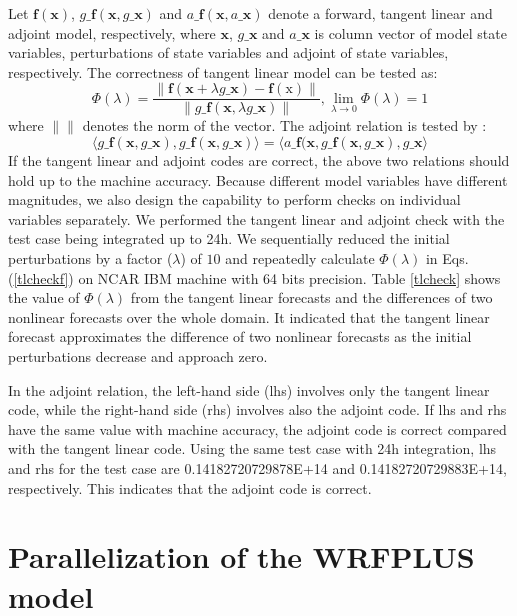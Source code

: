\documentclass[12pt]{article}
\begin{document}
Let $\mathbf{f}(\mathbf{x})$, $g\_\mathbf{f}(\mathbf{x},g\_\mathbf{x})$ and $a\_\mathbf{f}(\mathbf{x},a\_\mathbf{x})$ denote a forward, tangent linear and adjoint model, respectively, where $\mathbf{x}$, $g\_\mathbf{x}$ and $a\_\mathbf{x}$ is column vector of model state variables, perturbations of state variables and adjoint of state variables, respectively. The correctness of tangent linear model can be tested as:
\begin{equation}
\label{tlcheckf}
{\Phi(\lambda)}={\frac{\|\mathbf{f}(\mathbf{x}+{\lambda}g\_\mathbf{x})-\mathbf{f}(\mathrm{x})\|}{{\|g\_\mathbf{f}(\mathbf{x},{\lambda}g\_\mathbf{x})\|}}},  \lim_{\lambda \rightarrow 0}{\Phi(\lambda)}=1
\end{equation}
where $\|\|$ denotes the norm of the vector.
The adjoint relation is tested by :
\begin{equation}
\label{adcheck}
\langle g\_\mathbf{f}(\mathbf{x},g\_\mathbf{x}),g\_\mathbf{f}(\mathbf{x},g\_\mathbf{x}) \rangle = \langle a\_\mathbf{f}(\mathbf{x},g\_\mathbf{f}(\mathbf{x},g\_\mathbf{x}),g\_\mathbf{x} \rangle
\end{equation}
If the tangent linear and adjoint codes are correct, the above two relations should hold up to the machine accuracy. Because different model variables have different magnitudes, we also design the capability to perform checks on individual variables separately. We performed the tangent linear and adjoint check with the test case being integrated up to 24h. We sequentially reduced the initial perturbations by a factor ($\lambda$) of $10$ and repeatedly calculate $\Phi(\lambda)$ in Eqs. (\ref{tlcheckf}) on NCAR IBM machine with 64 bits precision. Table \ref{tlcheck} shows the value of $\Phi(\lambda)$ from the tangent linear forecasts and the differences of two nonlinear forecasts over the whole domain. It indicated that the tangent linear forecast approximates the difference of two nonlinear forecasts as the initial perturbations decrease and approach zero.

In the adjoint relation, the left-hand side (lhs) involves only the tangent linear code, while the right-hand side (rhs) involves also the adjoint code. If lhs and rhs have the same value with machine accuracy, the adjoint code is correct compared with the tangent linear code. Using the same test case with 24h integration, lhs and rhs for the test case are 0.14182720729878E+14 and 0.14182720729883E+14, respectively. This indicates that the adjoint code is correct.


\section{Parallelization of the WRFPLUS model}
\end{document}
